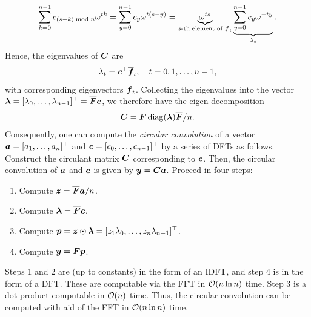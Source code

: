 \begin{equation*}
	\sum_{k=0}^{n-1} c_{(s-k) \bmod n} \omega^{tk} = \sum_{y=0}^{n-1} c_y \omega^{t(s-y)} = \underbrace{\omega^{ts}}_{s\text{-th element of } \boldsymbol{f}_t} \underbrace{\sum_{y=0}^{n-1} c_y \omega^{-ty}}_{\lambda_t}.
\end{equation*}
Hence, the eigenvalues of \(\boldsymbol{C}\) are
\begin{equation*}
	\lambda_t = \boldsymbol{c}^\top \overline{\boldsymbol{f}}_t, \quad t = 0, 1, \dots, n-1,
\end{equation*}
with corresponding eigenvectors \(\boldsymbol{f}_t\). Collecting the eigenvalues into the vector \(\boldsymbol{\lambda} = [\lambda_0, \dots, \lambda_{n-1}]^\top = \overline{\boldsymbol{F}} \boldsymbol{c}\), we therefore have the eigen-decomposition
\begin{equation*}
	\boldsymbol{C} = \boldsymbol{F} \operatorname{diag}(\boldsymbol{\lambda}) \overline{\boldsymbol{F}} / n.
\end{equation*}
Consequently, one can compute the \textit{circular convolution} of a vector \(\boldsymbol{a} = [a_1, \dots, a_n]^\top\) and \(\boldsymbol{c} = [c_0, \dots, c_{n-1}]^\top\) by a series of DFTs as follows. Construct the circulant matrix \(\boldsymbol{C}\) corresponding to \(\boldsymbol{c}\). Then, the circular convolution of \(\boldsymbol{a}\) and \(\boldsymbol{c}\) is given by \(\boldsymbol{y} = \boldsymbol{Ca}\). Proceed in four steps:
\begin{enumerate}
	\item Compute \(\boldsymbol{z} = \overline{\boldsymbol{F}} \boldsymbol{a} / n\).
	\item Compute \(\boldsymbol{\lambda} = \overline{\boldsymbol{F}} \boldsymbol{c}\).
	\item Compute \(\boldsymbol{p} = \boldsymbol{z} \odot \boldsymbol{\lambda} = [z_1 \lambda_0, \dots, z_n \lambda_{n-1}]^\top\).
	\item Compute \(\boldsymbol{y} = \boldsymbol{Fp}\).
\end{enumerate}
Steps 1 and 2 are (up to constants) in the form of an IDFT, and step 4 is in the form of a DFT. These are computable via the FFT in \(\mathcal{O}(n \ln n)\) time. Step 3 is a dot product computable in \(\mathcal{O}(n)\) time. Thus, the circular convolution can be computed with aid of the FFT in \(\mathcal{O}(n \ln n)\) time.

